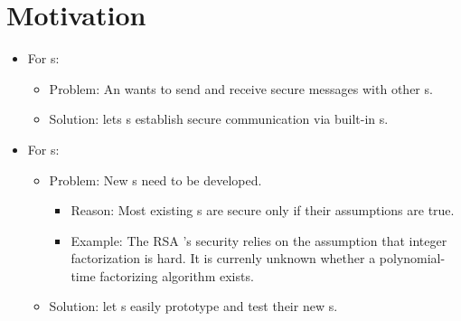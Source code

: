 \section{Motivation}

\begin{itemize}
\item For \eu s:
  \begin{itemize}
  \item Problem: An \eu{} wants to send and receive
    secure messages with other \eu s.
  \item Solution: \cry{} lets \eu s establish
    secure communication via built-in \cs s.
  \end{itemize}
\item For \cg s:
  \begin{itemize}
  \item Problem: New \cs s need to be developed.
    \begin{itemize}
    \item Reason: Most existing \cs s are secure
      only if their assumptions are true.
    \item Example: The RSA \cs's security relies on
      the assumption that integer factorization is hard.
      It is currenly unknown whether
      a polynomial-time factorizing algorithm exists.
    \end{itemize}
  \item Solution: \cry{} let \cg s easily prototype
    and test their new \cs s.
  \end{itemize}
\end{itemize}
